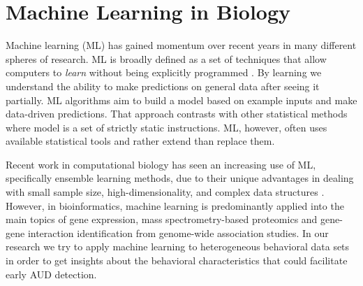 \section{Machine Learning in Biology}
Machine learning (ML) has gained momentum over recent years in many different spheres of research. ML is broadly defined as a set of techniques that allow computers to \textit{learn} without being explicitly programmed . By learning we understand the ability to make predictions on general data after seeing it partially. ML algorithms aim to build a model based on example inputs and make data-driven predictions. That approach contrasts with other statistical methods where model is a set of strictly static instructions. ML, however, often uses available statistical tools and rather extend than replace them. 

Recent work in computational biology has seen an increasing use of ML, specifically ensemble learning methods, due to their unique advantages in dealing with small sample size, high-dimensionality, and complex data structures . However, in bioinformatics, machine learning is predominantly applied into the main topics of gene expression, mass spectrometry-based proteomics and gene-gene interaction identification from genome-wide association studies. In our research we try to apply machine learning to heterogeneous behavioral data sets in order to get insights about the behavioral characteristics that could facilitate early AUD detection. 


